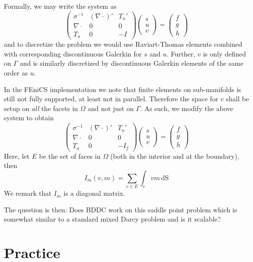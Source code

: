 \documentclass[11pt,a4paper]{article}
\begin{document}
Formally, we may write the system as 
\[
\left(
\begin{array}{ccc}
\sigma^{-1} & (\nabla\cdot)' & T_n' \\
\nabla \cdot & 0 & 0 \\ 
T_n & 0 & -I  
\end{array}
\right)
\left(
\begin{array}{c}
s \\ u \\ v  
\end{array}
\right)
= 
\left(
\begin{array}{c}
f \\ g \\ h  
\end{array}
\right)
\]
and to discretize the problem we would use
Raviart-Thomas elements combined with corresponding discontinuous 
Galerkin for $s$ and $u$. Further, $v$ is only defined on $\Gamma$
and is similarly discretized by discontinuous Galerkin elements
of the same order as $u$. 

In the FEniCS implementation we note that finite elements
on sub-manifolds is still not fully supported, at least not
in parallel. Therefore the space for $v$ shall be setup on \emph{all}
the facets in $\Omega$ and not just on $\Gamma$. As such, we modify the
above system to obtain 
\[
\left(
\begin{array}{ccc}
\sigma^{-1} & (\nabla\cdot)' & T_n' \\
\nabla \cdot & 0 & 0 \\ 
T_n & 0 & -I_f  
\end{array}
\right)
\left(
\begin{array}{c}
s \\ u \\ v  
\end{array}
\right)
= 
\left(
\begin{array}{c}
f \\ g \\ h  
\end{array}
\right)
\]
Here, let $E$ be the set of faces in $\Omega$ (both 
in the interior and at the boundary), then   
\[
I_m (v,m) = \sum_{e \in E}\int_e v m \, \mbox{dS}  
\]
We remark that $I_m$ is a diagonal matrix. 

The question is then: Does BDDC work on this saddle point problem which
is somewhat similar to a standard mixed Darcy problem and is it scalable?

\section*{Practice}
\end{document}
